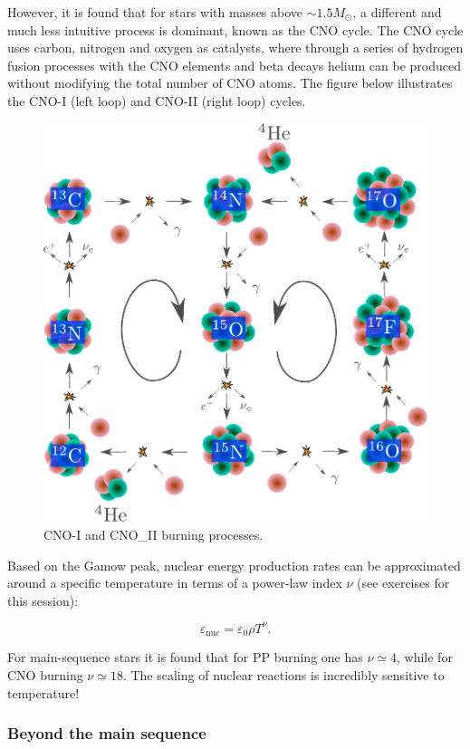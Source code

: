 \documentclass[twocolumn]{article}
\begin{document}
However, it is found that for stars with masses above
\(\sim 1.5M_\odot\), a different and much less intuitive process is
dominant, known as the CNO cycle. The CNO cycle uses carbon, nitrogen
and oxygen as catalysts, where through a series of hydrogen fusion
processes with the CNO elements and beta decays helium can be produced
without modifying the total number of CNO atoms. The figure below
illustrates the CNO-I (left loop) and CNO-II (right loop) cycles.

\begin{figure}
\centering
\includegraphics{../assets/7_nucleo1/CNO.pdf}
\caption{CNO-I and CNO\_II burning processes.}
\end{figure}

Based on the Gamow peak, nuclear energy production rates can be
approximated around a specific temperature in terms of a power-law index
\(\nu\) (see exercises for this session):

\[\varepsilon_\mathrm{nuc}=\varepsilon_0 \rho T^\nu.\]

For main-sequence stars it is found that for PP burning one has
\(\nu\simeq4\), while for CNO burning \(\nu\simeq 18\). The scaling of
nuclear reactions is incredibly sensitive to temperature!

\hypertarget{beyond-the-main-sequence}{%
\subsubsection{Beyond the main
sequence}\label{beyond-the-main-sequence}}
\end{document}
